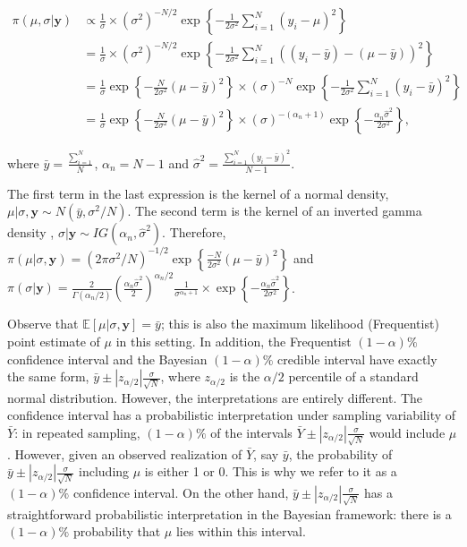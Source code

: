 \begin{align*}
	\pi(\mu,\sigma|\mathbf{y})&\propto \frac{1}{\sigma}\times (\sigma^2)^{-N/2}\exp\left\{-\frac{1}{2\sigma^2}\sum_{i=1}^N (y_i-\mu)^2\right\}\\
	&= \frac{1}{\sigma}\times (\sigma^2)^{-N/2}\exp\left\{-\frac{1}{2\sigma^2}\sum_{i=1}^N ((y_i-\bar{y}) - (\mu-\bar{y}))^2\right\}\\
	&=  \frac{1}{\sigma}\exp\left\{-\frac{N}{2\sigma^2}(\mu-\bar{y})^2\right\}\times (\sigma)^{-N}\exp\left\{-\frac{1}{2\sigma^2}\sum_{i=1}^N (y_i-\bar{y})^2\right\}\\
	&=  \frac{1}{\sigma}\exp\left\{-\frac{N}{2\sigma^2}(\mu-\bar{y})^2\right\}\times (\sigma)^{-(\alpha_n+1)}\exp\left\{-\frac{\alpha_n\hat{\sigma}^2}{2\sigma^2}\right\},	
\end{align*}

where $\bar{y}=\frac{\sum_{i=1}^N}{N}$, $\alpha_n=N-1$ and $\hat{\sigma}^2=\frac{\sum_{i=1}^N (y_i-\bar{y})^2}{N-1}$.

The first term in the last expression is the kernel of a normal density, $\mu|\sigma,\mathbf{y}\sim N(\bar{y},\sigma^2/N)$. The second term is the kernel of an inverted gamma density \cite{zellner1996introduction}, $\sigma|\mathbf{y}\sim IG(\alpha_n,\hat{\sigma}^2)$. Therefore, $\pi(\mu|\sigma,\mathbf{y})=(2\pi\sigma^2/N)^{-1/2}\exp\left\{\frac{-N}{2\sigma^2}(\mu-\bar{y})^2\right\}$ and $\pi(\sigma|\mathbf{y})=\frac{2}{\Gamma(\alpha_n/2)}\left(\frac{\alpha_n\hat{\sigma}^2}{2}\right)^{\alpha_n/2}\frac{1}{\sigma^{\alpha_n+1}}\times\exp\left\{-\frac{\alpha_n\hat{\sigma}^2}{2\sigma^2}\right\}$.

Observe that $\mathbb{E}[\mu | \sigma, \mathbf{y}] = \bar{y}$; this is also the maximum likelihood (Frequentist) point estimate of $\mu$ in this setting. In addition, the Frequentist $(1-\alpha)\%$ confidence interval and the Bayesian $(1-\alpha)\%$ credible interval have exactly the same form, $\bar{y} \pm |z_{\alpha/2}| \frac{\sigma}{\sqrt{N}}$, where $z_{\alpha/2}$ is the $\alpha/2$ percentile of a standard normal distribution. However, the interpretations are entirely different. The confidence interval has a probabilistic interpretation under sampling variability of $\bar{Y}$: in repeated sampling, $(1-\alpha)\%$ of the intervals $\bar{Y} \pm |z_{\alpha/2}| \frac{\sigma}{\sqrt{N}}$ would include $\mu$. However, given an observed realization of $\bar{Y}$, say $\bar{y}$, the probability of $\bar{y} \pm |z_{\alpha/2}| \frac{\sigma}{\sqrt{N}}$ including $\mu$ is either 1 or 0. This is why we refer to it as a $(1-\alpha)\%$ confidence interval. On the other hand, $\bar{y} \pm |z_{\alpha/2}| \frac{\sigma}{\sqrt{N}}$ has a straightforward probabilistic interpretation in the Bayesian framework: there is a $(1-\alpha)\%$ probability that $\mu$ lies within this interval.

